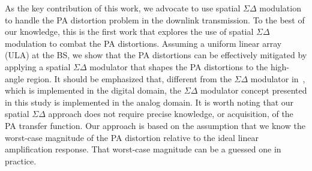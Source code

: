 \documentclass[10pt,twocolumn,twoside]{IEEEtran}
\def\blue{\color{blue}}
\begin{document}
As the key contribution of this work, we advocate to use spatial $\Sigma \Delta$ modulation to handle the PA distortion problem in the downlink transmission.
To the best of our knowledge, this is the first work that explores the use of spatial $\Sigma \Delta$ modulation to combat the PA distortions.
Assuming a uniform linear array (ULA) at the BS, we show that the PA distortions can be effectively mitigated by applying a spatial $\Sigma \Delta$ modulator that shapes the PA distortions to the high-angle region.
It should be emphasized that, different from the $\Sigma \Delta$ modulator in~\cite{shao2019one}, which is implemented in the digital domain, the $\Sigma \Delta$ modulator concept presented in this study is implemented in the analog domain.
It is worth noting that our spatial $\Sigma \Delta$ approach does not require precise knowledge, or acquisition, of the PA transfer function.
Our approach is based on the assumption that we know the worst-case magnitude of the PA distortion relative to the ideal linear amplification response.
That worst-case magnitude can be a guessed one in practice.


\end{document}
